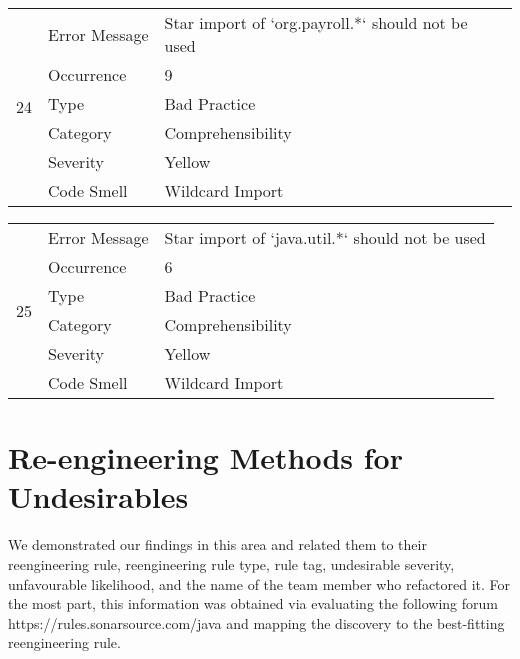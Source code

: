 \documentclass[12pt,english]{article}
\begin{document}
\begin{table}[!ht]
    \begin{tabularx}{\textwidth}{|c|l|X|}
    \hline
        \multirow{6}{*}{24} & Error Message & Star import of `org.payroll.*` should not be used \\ \cline{2-3}
        & Occurrence & 9 \\ \cline{2-3}
        & Type & Bad Practice \\ \cline{2-3}
        & Category & Comprehensibility \\ \cline{2-3}
        & Severity & Yellow \\ \cline{2-3}
        & Code Smell & Wildcard Import \\ \hline
    \end{tabularx}
\end{table}


\begin{table}[!ht]
    \begin{tabularx}{\textwidth}{|c|l|X|}
    \hline
        \multirow{6}{*}{25} & Error Message & Star import of `java.util.*` should not be used \\ \cline{2-3}
        & Occurrence & 6 \\ \cline{2-3}
        & Type & Bad Practice \\ \cline{2-3}
        & Category & Comprehensibility \\ \cline{2-3}
        & Severity & Yellow \\ \cline{2-3}
        & Code Smell & Wildcard Import \\ \hline
    \end{tabularx}
\end{table}
\clearpage

\newpage

\section{ Re-engineering Methods for Undesirables}
We demonstrated our findings in this area and related them to their reengineering rule, reengineering rule type, rule tag, undesirable severity, unfavourable likelihood, and the name of the team member who refactored it. For the most part, this information was obtained via evaluating the following forum https://rules.sonarsource.com/java and mapping the discovery to the best-fitting reengineering rule.
\end{document}

